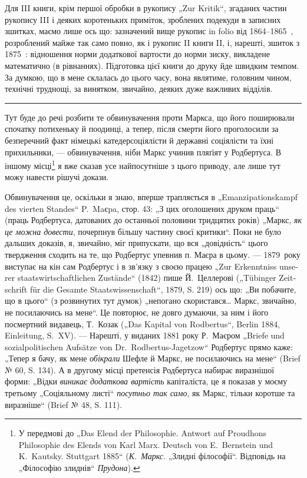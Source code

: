 Для III книги, крім першої обробки в рукопису „Zur Kritik“, згаданих
частин рукопису III і деяких коротеньких приміток, зроблених подекуди
в записних зшитках, маємо лише ось що: зазначений вище рукопис
in folio від 1864--1865~, розроблений майже так само повно, як
і рукопис II книги II, і, нарешті, зшиток з 1875~: відношення норми
додаткової вартости до норми зиску, викладене математично (в рівнаннях).
Підготовка цієї книги до друку йде швидким темпом. За думкою,
що в мене склалась до цього часу, вона являтиме, головним чином, технічні
труднощі, за винятком, звичайно, деяких дуже важливих відділів.

\pfbreak{}

\vspace*{\fill}
Тут буде до речі розбити те обвинувачення проти Маркса, що його
поширювали спочатку потихеньку й поодинці, а тепер, після смерти його
проголосили за безперечний факт німецькі катедерсоціялісти й державні
соціялісти та їхні прихильники, — обвинувачення, ніби Маркс учинив
пляґіят у Родбертуса. В іншому місці\footnote{
У передмові до „Das Elend der Philosophie. Antwort auf Proudhons Philosophie
des Elends von Karl Marx. Deutsch von E.~Bernstein und K.~Kautsky.
Stuttgart 1885“ (\emph{К.~Маркс}. „Злидні філософії“. Відповідь на „Філософію злиднів“
\emph{Прудона}).
} я вже сказав усе найпосутніше
з цього приводу, але лише тут можу навести рішучі докази.

Обвинувачення це, оскільки я знаю, вперше трапляється в „\textgerman{Emanzipationskampf
des vierten Standes}“ P.~Maєpa, стор. 43: „З цих оголошених
друком праць“ (праць Родбертуса, датованих до останньої половини
тридцятих років) „Маркс, \emph{як це можна довести}, почерпнув більшу частину
своєї критики“. Поки не було дальших доказів, я, звичайно, міг
припускати, що вся „довідність“ цього твердження сходить на те, що
Родбертус упевнив п. Маєра в цьому. — 1879~року виступає на кін сам Родбертус
і в зв’язку з своєю працею „\textgerman{Zur Erkenntniss unserer staatswirtschaftlichen
Zustände}“ (1842) пише Й.~Целлерові („\textgerman{Tübinger Zeitschrift für
die Gesamte Staatswissenschaft}“, 1879, S. 219) ось що: „Ви побачите, що
в цього“ (з розвинутих тут думок) „непогано скористався\dots{} Маркс, звичайно,
не посилаючись на мене“. Це повторює, не довго думаючи, за ним
і його посмертний видавець, Т.~Козак („Das Kapital von Rodbertus“, Berlin
1884, Einleitung, S.~XV). — Нарешті, у виданих 1881 року Р.~Маєром
„Briefe und sozialpolitischen Aufsätze von Dr.~Rodbertus-Jagetzow“ Родбертус
прямо каже: „Тепер я бачу, як мене \emph{обікрали} Шефле й Маркс, не
посилаючись на мене“ (Brief № 60, S. 134). А в другому місці претенсія
Родбертуса набирає виразнішої форми: „Відки \emph{виникає додаткова
вартість} капіталіста, це я показав у моєму третьому „Соціяльному листі“
\emph{посутньо так само}, як Маркс, тільки коротше та виразніше“ (Brief
№ 48, S. 111).

